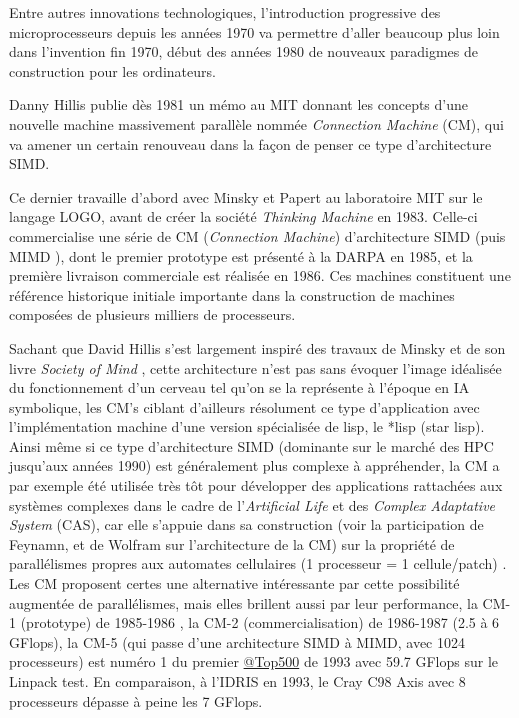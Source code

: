 
Entre autres innovations technologiques, l'introduction progressive des microprocesseurs depuis les années 1970 va permettre d'aller beaucoup plus loin dans l'invention fin 1970, début des années 1980 de nouveaux paradigmes de construction pour les ordinateurs. %

Danny Hillis publie dès 1981 un mémo au MIT donnant les concepts \autocite{Hillis1981} d'une nouvelle machine massivement parallèle nommée \textit{Connection Machine} (CM), qui va amener un certain renouveau dans la façon de penser ce type d'architecture SIMD.

Ce dernier travaille d'abord avec Minsky et Papert au laboratoire MIT sur le langage LOGO, avant de créer la société \textit{Thinking Machine} en 1983. Celle-ci commercialise une série de CM (\textit{Connection Machine}) d’architecture SIMD (puis MIMD ), dont le premier prototype est présenté à la DARPA en 1985, et la première livraison commerciale est réalisée en 1986. Ces machines constituent une référence historique initiale importante dans la construction de machines composées de plusieurs milliers de processeurs.

Sachant que David Hillis s'est largement inspiré des travaux de Minsky et de son livre \textit{Society of Mind} , cette architecture n'est pas sans évoquer l'image idéalisée du fonctionnement d'un cerveau  tel qu'on se la représente à l'époque en IA symbolique, les CM's ciblant d'ailleurs résolument ce type d'application avec l'implémentation machine d'une version spécialisée de lisp, le *lisp (star lisp). Ainsi même si ce type d’architecture SIMD (dominante sur le marché des HPC jusqu’aux années 1990) est généralement plus complexe à appréhender, la CM a par exemple été utilisée très tôt pour développer des applications rattachées aux systèmes complexes dans le cadre de l’\textit{Artificial Life} et des \textit{Complex Adaptative System} (CAS), car elle s’appuie dans sa construction (voir la participation de Feynamn, et de Wolfram sur l'architecture de la CM) sur la propriété de parallélismes propres aux automates cellulaires (1 processeur = 1 cellule/patch) . Les CM proposent certes une alternative intéressante par cette possibilité augmentée de parallélismes, mais elles brillent aussi par leur performance, la CM-1 (prototype) de 1985-1986 , la CM-2 (commercialisation) de 1986-1987 (2.5 à 6 GFlops), la CM-5 (qui passe d'une architecture SIMD à MIMD, avec 1024 processeurs) est numéro 1 du premier \href{http://www.top500.org/featured/systems/cm-5-los-alamos-national-lab/}{@Top500} de 1993 avec 59.7 GFlops sur le Linpack test. En comparaison, à l'IDRIS en 1993, le Cray C98 Axis avec 8 processeurs dépasse à peine les 7 GFlops.


